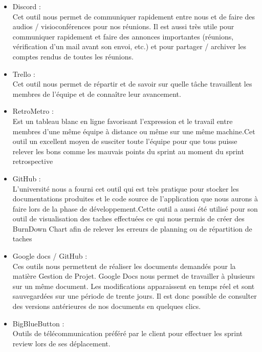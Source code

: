 \begin{itemize}
	\item Discord :\\
	Cet outil nous permet de communiquer rapidement entre nous et
    de faire des audios / visioconférences pour nos réunions. Il est aussi très utile
    pour communiquer rapidement et faire des annonces importantes (réunions,
    vérification d’un mail avant son envoi, etc.) et pour partager / archiver les
    comptes rendus de toutes les réunions.\\
	
    \item Trello :\\
	Cet outil nous permet de répartir et de savoir sur quelle tâche
    travaillent les membres de l’équipe et de connaître leur avancement.\\
		
		\item RetroMetro :\\
		Est un tableau blanc en ligne favorisant l’expression et le travail entre membres d’une même équipe 
		à distance ou même sur une même machine.Cet outil un excellent moyen de susciter toute l'équipe pour
		que tous puisse relever les bons comme les mauvais points du sprint au moment du sprint retrospective\\

    \item GitHub :\\
	L’université nous a fourni cet outil qui est très pratique pour stocker
    les documentations produites et le code source de l’application que nous
    aurons à faire lors de la phase de développement.Cette outil a aussi été utilisé pour son outil de visualisation des taches effectuées
		ce qui nous permis de créer des BurnDown Chart afin de relever les erreurs de planning ou de répartition de taches\\
	
    \item Google docs / GitHub :\\
	Ces outils nous permettent de réaliser les documents demandés
    pour la matière Gestion de Projet. Google Docs nous permet de travailler à
    plusieurs sur un même document. Les modifications apparaissent en temps
    réel et sont sauvegardées sur une période de trente jours. Il est donc possible
    de consulter des versions antérieures de nos documents en quelques clics.\\

		\item BigBlueButton :\\
		Outils de télécommunication préféré par le client pour effectuer les sprint review lors de ses déplacement.	


\end{itemize}

